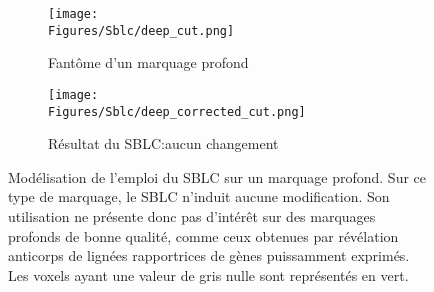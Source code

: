 \documentclass[\main/main.tex]{subfiles}
\begin{document}
\begin{figure}
    \centering
    \begin{subfigure}[b]{0.45\textwidth}
        
        \caption{Fantôme d'un marquage profond}
        \centering \texttt{[image: \\Figures/Sblc/deep\_cut.png]}
        \label{fig:sblc:defaut:deep:application}
    \end{subfigure}
    \begin{subfigure}[b]{0.45\textwidth} 
        \caption{Résultat du SBLC:\newline aucun changement}
        \centering \texttt{[image: \\Figures/Sblc/deep\_corrected\_cut.png]}
        \label{fig:sblc:defaut:deep:application}
    \end{subfigure}
    \caption{
        Modélisation de l'emploi du SBLC sur un marquage profond.
        \newline
        Sur ce type de marquage, le SBLC n'induit aucune modification. Son utilisation ne présente donc pas d'intérêt sur des marquages profonds de bonne qualité, comme ceux  obtenues par révélation anticorps de lignées rapportrices de gènes puissamment exprimés.
        \newline
        Les voxels ayant une valeur de gris nulle sont représentés en vert.
        }
    \label{fig:sblc:defaut:deep}
\end{figure}
\end{document}
